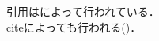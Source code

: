 \documentclass{ltjsarticle}
\begin{document}
引用は\textcite{hoge}によって行われている．\\citeによっても行われる(\cite{hogehoge})．

\printbibliography[title=参考文献]
\end{document}
